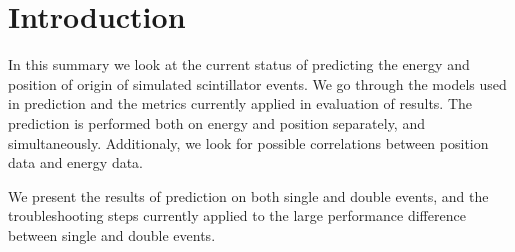 \section{Introduction}
In this summary we look at the current status of predicting the energy and
position of origin of simulated scintillator events. We go through the models
used in prediction and the metrics currently applied in evaluation of results.
The prediction is performed both on energy and position separately, and
simultaneously. Additionaly, we look for possible correlations between position
data and energy data.

We present the results of prediction on both single and double events, and
the troubleshooting steps currently applied to the large performance difference
between single and double events.

